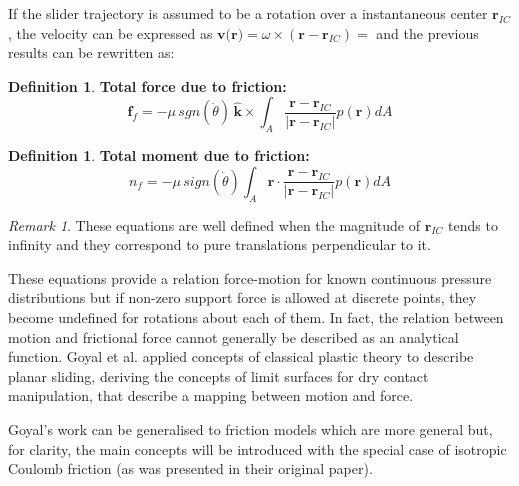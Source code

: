 \documentclass[12,twoside]{TFG-GM}
\theoremstyle{definition}
\newtheorem{definition}[theorem]{Definition}
\theoremstyle{remark}
\newtheorem{remark}[theorem]{Remark}
\begin{document}
If the slider trajectory is assumed to be a rotation over a instantaneous center $\textbf{r}_{IC}$, the velocity can be expressed as $\textbf{v(r)} = \omega \times (\textbf{r} - \textbf{r}_{IC}) = $ and the previous results can be rewritten as:
\begin{definition} \textbf{Total force due to friction:} 
\begin{equation}
\textbf{f}_f = - \mu \, sgn(\dot{\theta}) \, \hat{\textbf{k}} \times \int_A \dfrac{\textbf{r} - \textbf{r}_{IC}}{|\textbf{r} - \textbf{r}_{IC}|} p(\textbf{r}) dA
\end{equation}
\end{definition}
\begin{definition} \label{def:} \textbf{Total moment due to friction:}
\begin{equation} \label{eq:momentum_cor}
n_f = - \mu  \, sign(\dot{\theta}) \int_A \textbf{r} \cdot \dfrac{\textbf{r} - \textbf{r}_{IC}}{|\textbf{r} - \textbf{r}_{IC}|} p(\textbf{r}) dA
\end{equation}
\end{definition}

\begin{remark} 
These equations are well defined when the magnitude of $\textbf{r}_{IC}$ tends to infinity and they correspond to pure translations perpendicular to it.
\end{remark}

These equations provide a relation force-motion for known continuous pressure distributions but if non-zero support force is allowed at discrete points, they become undefined for rotations about each of them. In fact, the relation between motion and frictional force cannot generally be described as an analytical function. Goyal et al. \cite{planar_sliding1}\cite{planar_sliding2} applied concepts of classical plastic theory to describe planar sliding, deriving the concepts of limit surfaces for dry contact manipulation, that describe a mapping between motion and force.

Goyal's work can be generalised to friction models which are more general but, for clarity, the main concepts will be introduced with the special case of isotropic Coulomb friction (as was presented in their original paper).
\end{document}

